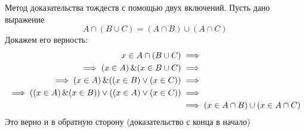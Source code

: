 Метод доказательства тождеств с помощью двух включений. Пусть дано выражение \[
A \cap (B \cup C) = (A \cap B) \cup (A \cap C)
\]
Докажем его верность:
\begin{align*}
	x \in A \cap (B \cup C) &\implies \\
	\implies (x \in A)\operatorname{\&} (x \in B \cup C) &\implies \\
	\implies (x \in A)\operatorname{\&} ((x \in B)\lor(x \in C)) &\implies \\
	\implies ((x \in A)\operatorname{\&}(x \in B))\lor((x \in A)\lor(x \in C)) &\implies \\
								       &\implies (x \in A \cap B) \cup (x \in A \cap C)
\end{align*}
Это верно и в обратную сторону (доказательство с конца в начало)

